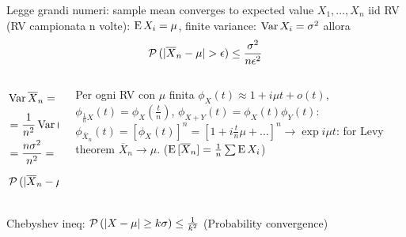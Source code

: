 \documentclass[asd-beamer.tex]{subfiles}
\begin{document}
\begin{frame}{Legge grandi numeri: sample mean converges to expected value}
$X_1,\ldots,X_n$ iid RV (RV campionata n volte): $\operatorname{E}{X_i}=\mu$, finite variance: $\operatorname{Var}{X_i}=\sigma^2$ allora \[\prob{(|\overline{X}_n-\mu|>\epsilon)}\leq\frac{\sigma^2}{n\epsilon^2}\]
    \begin{columns}
    \begin{column}{0.4\textwidth}
\begin{align*}
&\var{\overline{X}_n}=\var{\frac{1}{n}(X_1+\ldots+X_n)}\\
&=\frac{1}{n^2}\var{(X_1+\ldots+X_n)}\\
&=\frac{n\sigma^2}{n^2}=\frac{\sigma^2}{n}\\
&\prob{(|\overline{X}_n-\mu|>\epsilon)}\leq\frac{\sigma^2}{n\epsilon^2}
\end{align*}
    \end{column}
    \begin{column}{0.6\textwidth}
Per ogni RV con $\mu$ finita 
$\phi_X(t)\approx1+i\mu t+o(t)$,$\phi_{\frac{1}{n}X}(t)=\phi_X(\frac{t}{n})$, $\phi_{X+Y}(t)=\phi_X(t)\phi_Y(t)$:
$\phi_{\overline{X}_n}(t)=[\phi_X(t)]^n=[1+i\frac{t}{n}\mu+\ldots]^n\to\exp{i\mu t}$: for Levy theorem $\overline{X}_n\to\mu$. ($\operatorname{E}{[\overline{X}_n]}=\frac{1}{n}\sum\operatorname{E}{X_i}$)
    \end{column}
    \end{columns}
Chebyshev ineq: $\operatorname{\mathcal{P}}{(|X-\mu|\geq k\sigma)}\leq\frac{1}{k^2}$ (Probability convergence)
\end{frame}
\end{document}
